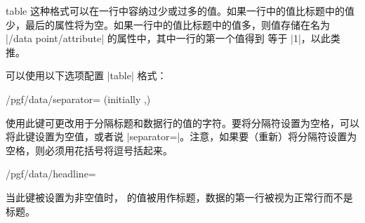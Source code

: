 \begin{dataformat}{table}
    这种格式可以在一行中容纳过少或过多的值。如果一行中的值比标题中的值少，最后的属性将为空。如果一行中的值比标题中的值多，则值存储在名为 |/data point/attribute| 的属性中，其中一行的第一个值得到  等于 |1|，以此类推。


    可以使用以下选项配置 |table| 格式：
    \begin{key}{/pgf/data/separator= (initially ,)} %

        使用此键可更改用于分隔标题和数据行的值的字符。要将分隔符设置为空格，可以将此键设置为空值，或者说 |separator=\space|。注意，如果要（重新）将分隔符设置为空格，则必须用花括号将逗号括起来。
\begin{codeexample}[preamble={\usetikzlibrary{datavisualization}}]
\end{codeexample}
    \end{key}
    \begin{key}{/pgf/data/headline=} %

        当此键被设置为非空值时， 的值被用作标题，数据的第一行被视为正常行而不是标题。
\begin{codeexample}[preamble={\usetikzlibrary{datavisualization}}]
\end{codeexample}
    \end{key}
\end{dataformat}

